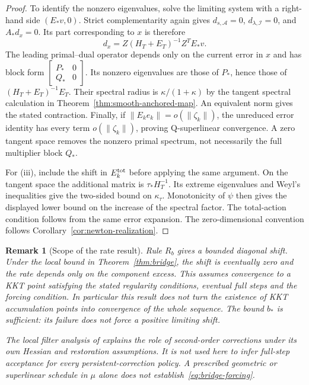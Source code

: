 \documentclass[pdflatex,sn-mathphys-num]{sn-jnl}
\theoremstyle{thmstyleone}
\theoremstyle{thmstylethree}
\newtheorem{remark}[theorem]{Remark}
\begin{document}
\begin{proof}
To identify the nonzero eigenvalues, solve the limiting system with a
right-hand side $(E_*v,0)$. Strict complementarity again gives
$d_{s,\mathcal A}=0$, $d_{\lambda,\mathcal I}=0$, and
$A_*d_x=0$. Its part corresponding to $x$ is therefore
\[
 d_x=Z(H_T+E_T)^{-1}Z^TE_*v.
\]
The leading primal--dual operator depends only on the current error in
$x$ and has block form $[\begin{smallmatrix}P_*&0\\Q_*&0\end{smallmatrix}]$.
Its nonzero eigenvalues are those of $P_*$, hence those of
$(H_T+E_T)^{-1}E_T$. Their spectral radius is
$\kappa/(1+\kappa)$ by the tangent spectral calculation in
Theorem~\ref{thm:smooth-anchored-map}.
An equivalent norm gives the stated contraction.
Finally, if $\|E_ke_k\|=o(\|\zeta_k\|)$, the unreduced error
identity has every term $o(\|\zeta_k\|)$, proving Q-superlinear
convergence. A zero tangent space removes the nonzero primal spectrum,
not necessarily the full multiplier block $Q_*$.

For (iii), include the shift in $E_k^{\rm tot}$ before
applying the same argument. On the tangent space the additional
matrix is $\tau_*H_T^{-1}$. Its extreme eigenvalues and Weyl's
inequalities give the two-sided bound on $\kappa_\tau$.
Monotonicity of $\psi$ then gives the displayed lower bound on the
increase of the spectral factor. The total-action condition follows
from the same error expansion. The zero-dimensional convention follows
Corollary~\ref{cor:newton-realization}.
\end{proof}

\begin{remark}[Scope of the rate result]
Rule $R_b$ gives a bounded diagonal shift. Under the local bound in
Theorem~\ref{thm:bridge}, the shift is eventually zero and the rate
depends only on the component excess. This assumes convergence to a KKT
point satisfying the stated regularity conditions, eventual full steps
and the forcing condition. In particular this result does not turn the
existence of KKT accumulation points into convergence of the whole
sequence. The bound $b_*$ is sufficient: its failure does not force
a positive limiting shift.

The local filter analysis of \citet{WachterBiegler2005Local} explains
the role of second-order corrections under its own Hessian and
restoration assumptions. It is not used here to infer full-step
acceptance for every persistent-correction policy.
A prescribed geometric or superlinear schedule in $\mu$ alone does
not establish~\eqref{eq:bridge-forcing}.
\end{remark}
\end{document}
